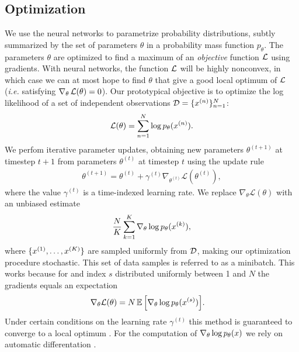   \subsection{Optimization}
    We use the neural networks to parametrize probability distributions, subtly summarized by the set of parameters $\theta$ in a probability mass function $p_{\theta}$. The parameters $\theta$ are optimized to find a maximum of an \textit{objective} function $\operatorname{\mathcal{L}}$ using gradients. With neural networks, the function $\operatorname{\mathcal{L}}$ will be highly nonconvex, in which case we can at most hope to find $\theta$ that give a good local optimum of $\operatorname{\mathcal{L}}$ (\textit{i.e.} satisfying $\nabla_{\theta} \operatorname{\mathcal{L}}(\theta) = 0$).  Our prototypical objective is to optimize the log likelihood of a set of independent observations $\mathcal{D} = \{ x^{(n)} \}_{n=1}^N$:
    \begin{align*}
      \operatorname{\mathcal{L}}(\theta) = \sum_{n=1}^N \log p_{\theta}(x^{(n)}).
    \end{align*}
    We perfom iterative parameter updates, obtaining new parameters $\theta^{(t+1)}$ at timestep $t+1$ from parameters $\theta^{(t)}$ at timestep $t$ using the update rule
    \begin{align*}
      \theta^{(t+1)} = \theta^{(t)} + \gamma^{(t)} \nabla_{\theta^{(t)}} \mathcal{L}( \theta^{(t)} ),
    \end{align*}
    where the value $\gamma^{(t)}$ is a time-indexed learning rate. We replace $\nabla_{\theta} \mathcal{L}(\theta)$ with an unbiased estimate
    \begin{align*}
      \frac{N}{K} \sum_{k=1}^{K} \nabla_{\theta} \log p_{\theta} (x^{(k)}),
    \end{align*}
    where $\{ x^{(1)}, \dots, x^{(K)}\}$ are sampled uniformly from $\mathcal{D}$, making our optimization procedure stochastic. This set of data samples is referred to as a minibatch. This works because for and index $s$ distributed uniformly between 1 and $N$ the gradients equals an expectation
    \begin{align*}
      \nabla_{\theta} \mathcal{L}(\theta)
        &=  N \operatorname{\mathbb{E}} \Big[ \nabla_{\theta} \log p_{\theta} (x^{(s)}) \Big].
    \end{align*}
    Under certain conditions on the learning rate $\gamma^{(t)}$ this method is guaranteed to converge to a local optimum \citep{robbins1951stochastic}. For the computation of $\nabla_{\theta} \log p_{\theta} (x)$ we rely on automatic differentation \citep{baydin2018automatic}.
